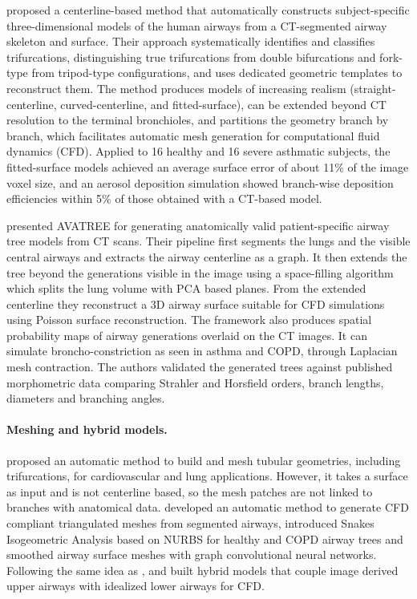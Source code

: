\citet{miyawaki2017automatic} proposed a centerline-based method that automatically
constructs subject-specific three-dimensional models of the human airways from a CT-segmented
airway skeleton and surface. Their approach systematically identifies and classifies
trifurcations, distinguishing true trifurcations from double bifurcations and fork-type from
tripod-type configurations, and uses dedicated geometric templates to reconstruct them. The
method produces models of increasing realism (straight-centerline, curved-centerline, and
fitted-surface), can be extended beyond CT resolution to the terminal bronchioles, and
partitions the geometry branch by branch, which facilitates automatic mesh generation for
computational fluid dynamics (CFD). Applied to 16 healthy and 16 severe asthmatic subjects,
the fitted-surface models achieved an average surface error of about 11\% of the image voxel
size, and an aerosol deposition simulation showed branch-wise deposition efficiencies within
5\% of those obtained with a CT-based model.

\citet{nousias2020avatree} presented AVATREE for generating
anatomically valid patient-specific airway tree models from CT scans. Their pipeline first
segments the lungs and the visible central airways and extracts the airway centerline as a
graph. It then extends the tree beyond the generations visible in the image using a
space-filling algorithm which splits the lung volume with PCA based planes. From the extended
centerline they reconstruct a 3D airway surface suitable for CFD simulations using Poisson
surface reconstruction. The framework also produces spatial probability maps of airway
generations overlaid on the CT images. It can simulate broncho-constriction as seen in asthma
and COPD, through Laplacian mesh contraction. The authors validated the generated trees
against published morphometric data comparing Strahler and Horsfield orders, branch lengths,
diameters and branching angles.

\paragraph{Meshing and hybrid models.}   %
\citet{marchandise2013} proposed an automatic method to build and mesh tubular geometries,
including trifurcations, for cardiovascular and lung applications. However, it takes a surface
as input and is not centerline based, so the mesh patches are not linked to branches with
anatomical data. \citet{lauria2022} developed an automatic method to generate CFD compliant
triangulated meshes from segmented airways, \citet{ortizpuerta2022} introduced Snakes
Isogeometric Analysis based on NURBS for healthy and COPD airway trees and \citet{ho2024}
smoothed airway surface meshes with graph convolutional neural networks. Following the same
idea as \citet{bordas2015}, \citet{agujetas2020} and \citet{ilegbusi2023} built hybrid models
that couple image derived upper airways with idealized lower airways for CFD.

